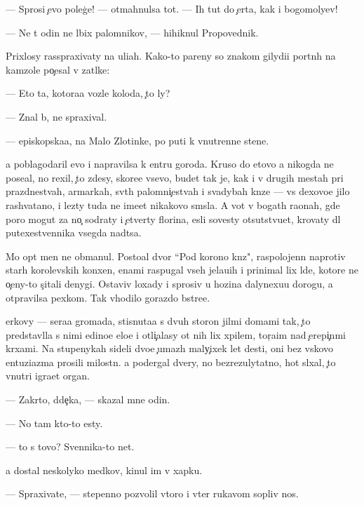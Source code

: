 \documentclass[10pt]{book}
\begin{document}
— Sprosi {\c}evo poleg{\c}e! — otmahnulsa tot. — Ih tut do {\c}erta, kak i bogomoly{\q}ev!

— Ne t{\yi} odin ne l{\iu}bix palomnikov, — hihiknul Propovednik.

Prixlosy rasspraxivaty na uli{\q}ah. Kako{\y}-to pareny so znakom gilydi{\y}i portn{\yi}h na kamzole po{\c}esal v zat{\yi}lke:

— Eto ta, kotora{\y}a vozle kolod{\q}a, {\c}to ly?

— Znal b{\yi}, ne spraxival.

— {\Y}episkopska{\y}a, na Malo{\y} Zlotinke, po puti k vnutrenne{\y} stene.

{\Y}a poblagodaril {\y}evo i napravilsa k {\q}entru goroda. Kruso do etovo {\y}a nikogda ne pose{\x}al, no rexil, {\c}to zdesy, skore{\y}e vsevo, budet tak je, kak i v drugih mestah pri prazdnestvah, {\y}armarkah, sv{\ia}t{\yi}h palomni{\c}estvah i svadybah kn{\ia}ze{\y} — vs{\e} dexovo{\y}e jil{\y}o rashvatano, i lezty tuda ne ime{\y}et nikakovo sm{\yi}sla. A vot v bogat{\yi}h ra{\y}onah, gde poro{\y} mogut za no{\c} sodraty i {\c}etverty florina, {\y}esli sovesty otsutstvu{\y}et, krovaty dl{\ia} putexestvennika vsegda na{\y}d{\e}tsa.

Mo{\y} op{\yi}t men{\ia} ne obmanul. Posto{\y}al{\yi}{\y} dvor ``Pod korono{\y} kn{\ia}z{\ia}", raspolojenn{\yi}{\y} naprotiv star{\yi}h korolevskih kon{\iu}xen, {\q}enami raspugal vseh jela{\y}u{\x}ih i prinimal lix l{\iu}de{\y}, kotor{\yi}{\y}e ne o{\c}eny-to s{\c}itali denygi. Ostaviv loxady i sprosiv u hoz{\ia}{\y}ina dalyne{\y}xu{\y}u dorogu, {\y}a otpravilsa pexkom. Tak v{\yi}hodilo gorazdo b{\yi}stre{\y}e.

{\Q}erkovy — sera{\y}a gromada, stisnuta{\y}a s dvuh storon jil{\yi}mi domami tak, {\c}to predstavl{\ia}la s nimi {\y}edino{\y}e {\q}elo{\y}e i otli{\c}alasy ot nih lix xpilem, tor{\c}a{\x}im nad {\c}erepi{\c}n{\yi}mi kr{\yi}xami. Na stupenykah sideli dvo{\y}e {\c}umaz{\yi}h maly{\c}ixek let des{\ia}ti, oni bez vs{\ia}kovo entuziazma prosili milost{\yi}n{\iu}. {\Y}a podergal dvery, no bezrezulytatno, hot{\ia} sl{\yi}xal, {\c}to vnutri igra{\y}et organ.

— Zakr{\yi}to, d{\ia}de{\c}ka, — skazal mne odin.

— No tam kto-to {\y}esty.

— {\C}to s tovo? Sv{\ia}{\x}ennika-to net.

{\Y}a dostal neskolyko med{\ia}kov, kinul im v xapku.

— Spraxiva{\y}te, — stepenno pozvolil vtoro{\y} i v{\yi}ter rukavom sopliv{\yi}{\y} nos.
\end{document}
